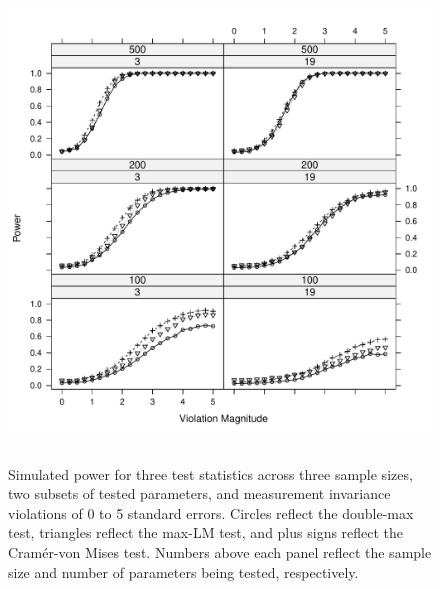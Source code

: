 \documentclass[man]{apa}
\begin{document}
\begin{figure}
\caption{Simulated power for three test statistics across three sample
  sizes, two subsets of tested parameters, and measurement invariance
  violations of 0 to 5 standard 
  errors.  Circles reflect the double-max test, triangles reflect the
  max-LM test, and plus signs reflect the Cram\'{e}r-von Mises test.
  Numbers above each panel reflect the sample size and number of
  parameters being tested, respectively.}
\label{fig:simres}
\includegraphics[height=5in]{simres.pdf}
\end{figure}
\end{document}
